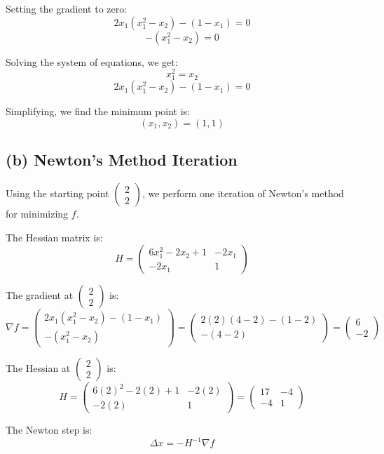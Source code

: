 \documentclass[12pt]{article}
\begin{document}
Setting the gradient to zero:
\[
2x_1(x_1^2 - x_2) - (1 - x_1) = 0
\]
\[
-(x_1^2 - x_2) = 0
\]

Solving the system of equations, we get:
\[
x_1^2 = x_2
\]
\[
2x_1(x_1^2 - x_2) - (1 - x_1) = 0
\]

Simplifying, we find the minimum point is:
\[
(x_1, x_2) = (1, 1)
\]

\subsection*{(b) Newton's Method Iteration}

Using the starting point \(\begin{pmatrix} 2 \\ 2 \end{pmatrix}\), we perform one iteration of Newton's method for minimizing \(f\).

The Hessian matrix is:
\[
H = \begin{pmatrix}
6x_1^2 - 2x_2 + 1 & -2x_1 \\
-2x_1 & 1
\end{pmatrix}
\]

The gradient at \(\begin{pmatrix} 2 \\ 2 \end{pmatrix}\) is:
\[
\nabla f = \begin{pmatrix}
2x_1(x_1^2 - x_2) - (1 - x_1) \\
-(x_1^2 - x_2)
\end{pmatrix}
= \begin{pmatrix}
2(2)(4 - 2) - (1 - 2) \\
-(4 - 2)
\end{pmatrix}
= \begin{pmatrix}
6 \\
-2
\end{pmatrix}
\]

The Hessian at \(\begin{pmatrix} 2 \\ 2 \end{pmatrix}\) is:
\[
H = \begin{pmatrix}
6(2)^2 - 2(2) + 1 & -2(2) \\
-2(2) & 1
\end{pmatrix}
= \begin{pmatrix}
17 & -4 \\
-4 & 1
\end{pmatrix}
\]

The Newton step is:
\[
\Delta x = -H^{-1} \nabla f
\]
\end{document}
